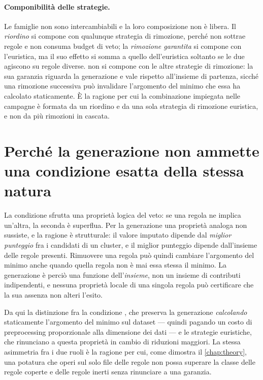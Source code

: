 \paragraph{Componibilità delle strategie.} Le famiglie non sono intercambiabili e la loro
composizione non è libera. Il \emph{riordino} si compone con qualunque strategia di rimozione,
perché non sottrae regole e non consuma budget di veto; la \emph{rimozione garantita} si compone
con l'euristica, ma il suo effetto si somma a quello dell'euristica soltanto se le due agiscono su
regole diverse.  non si compone con le altre strategie di rimozione: la sua
garanzia riguarda la generazione e vale rispetto all'insieme di partenza, sicché una rimozione
successiva può invalidare l'argomento del minimo che essa ha calcolato staticamente. È la ragione
per cui la combinazione impiegata nelle campagne è formata da un riordino e da una sola strategia
di rimozione euristica, e non da più rimozioni in cascata.

\section{Perché la generazione non ammette una condizione esatta della stessa natura}
\label{sec:generation-limit}

La condizione \Vtwo{} sfrutta una proprietà logica del veto: se una regola ne implica un'altra, la
seconda è superflua. Per la generazione una proprietà analoga non sussiste, e la ragione è
strutturale: il valore imputato dipende dal \emph{miglior punteggio} fra i candidati di un cluster,
e il miglior punteggio dipende dall'insieme delle regole presenti. Rimuovere una regola può quindi
cambiare l'argomento del minimo anche quando quella regola non è mai essa stessa il minimo. La
generazione è perciò una funzione dell'\emph{insieme}, non un insieme di contributi indipendenti,
e nessuna proprietà locale di una singola regola può certificare che la sua assenza non alteri
l'esito.

Da qui la distinzione fra la condizione , che preserva la generazione
\emph{calcolando} staticamente l'argomento del minimo sul dataset --- quindi pagando un costo di
preprocessing proporzionale alla dimensione dei dati --- e le strategie euristiche, che rinunciano
a questa proprietà in cambio di riduzioni maggiori. La stessa asimmetria fra i due ruoli è la
ragione per cui, come dimostra il \autoref{chap:theory}, una potatura che operi sul solo file
delle regole non possa superare la classe delle regole coperte e delle regole inerti senza
rinunciare a una garanzia.

